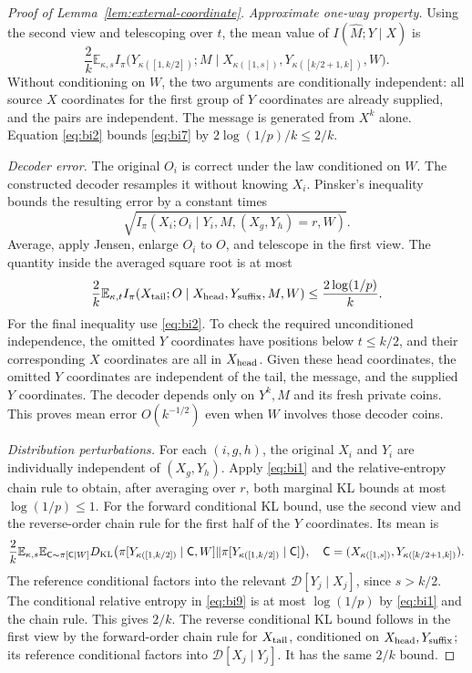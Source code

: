\documentclass[11pt,letterpaper]{article}
\numberwithin{equation}{section}
\newcommand{\E}{\mathbb E}
\begin{document}
\begin{proof}[Proof of Lemma~\ref{lem:external-coordinate}]
\emph{Approximate one-way property.} Using the second view and telescoping over $t$, the mean value of $I(\widehat M;Y\mid X)$ is
\begin{equation}
\frac2k\E_{\kappa,s}
 I_\pi\bigl(Y_{\kappa([1,k/2])};M
   \mid X_{\kappa([1,s])},Y_{\kappa([k/2+1,k])},W\bigr).
 \label{eq:bi7}
\end{equation}
Without conditioning on $W$, the two arguments are conditionally independent: all source $X$ coordinates for the first group of $Y$ coordinates are already supplied, and the pairs are independent.
The message is generated from $X^k$ alone.
Equation \eqref{eq:bi2} bounds \eqref{eq:bi7} by $2\log(1/p)/k\le2/k$.

\emph{Decoder error.} The original $O_i$ is correct under the law conditioned on $W$.
The constructed decoder resamples it without knowing $X_i$.
Pinsker's inequality bounds the resulting error by a constant times
\[
 \sqrt{I_\pi(X_i;O_i\mid Y_i,M,(X_g,Y_h)=r,W)}.
\]
Average, apply Jensen, enlarge $O_i$ to $O$, and telescope in the first view.
The quantity inside the averaged square root is at most
\begin{equation}
\frac2k\E_{\kappa,t}
 I_\pi(X_{\rm tail};O\mid X_{\rm head},Y_{\rm suffix},M,W)
 \le\frac{2\log(1/p)}k.
 \label{eq:bi8}
\end{equation}
For the final inequality use \eqref{eq:bi2}.
To check the required unconditioned independence, the omitted $Y$ coordinates have positions below $t\le k/2$, and their corresponding $X$ coordinates are all in $X_{\rm head}$.
Given these head coordinates, the omitted $Y$ coordinates are independent of the tail, the message, and the supplied $Y$ coordinates.
The decoder depends only on $Y^k,M$ and its fresh private coins.
This proves mean error $O(k^{-1/2})$ even when $W$ involves those decoder coins.

\emph{Distribution perturbations.} For each $(i,g,h)$, the original $X_i$ and $Y_i$ are individually independent of $(X_g,Y_h)$.
Apply \eqref{eq:bi1} and the relative-entropy chain rule to obtain, after averaging over $r$, both marginal KL bounds at most $\log(1/p)\le1$.
For the forward conditional KL bound, use the second view and the reverse-order chain rule for the first half of the $Y$ coordinates.
Its mean is
\begin{equation}
\frac2k\E_{\kappa,s}
 \E_{\mathsf{C}\sim\pi[\mathsf{C}\mid W]}
 D_{\rm KL}\bigl(
   \pi[Y_{\kappa([1,k/2])}\mid \mathsf{C},W]
   \Vert \pi[Y_{\kappa([1,k/2])}\mid \mathsf{C}]\bigr),
 \quad
 \mathsf{C}=(X_{\kappa([1,s])},Y_{\kappa([k/2+1,k])}).
 \label{eq:bi9}
\end{equation}
The reference conditional factors into the relevant $\mathcal D[Y_j\mid X_j]$, since $s>k/2$.
The conditional relative entropy in \eqref{eq:bi9} is at most $\log(1/p)$ by \eqref{eq:bi1} and the chain rule.
This gives $2/k$.
The reverse conditional KL bound follows in the first view by the forward-order chain rule for $X_{\rm tail}$, conditioned on $X_{\rm head},Y_{\rm suffix}$; its reference conditional factors into $\mathcal D[X_j\mid Y_j]$.
It has the same $2/k$ bound.


\end{proof}
\end{document}
